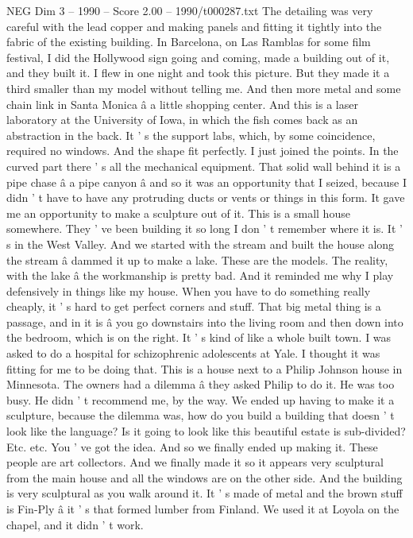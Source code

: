 \begin{textsample}{NEG Dim 3 – 1990 – Score 2.00 – 1990/t000287.txt}
The detailing was very careful with the lead copper and making panels and fitting it tightly into the fabric of the existing building.
In Barcelona, on Las Ramblas for some film festival, I did the Hollywood sign going and coming, made a building out of it, and they built it.
I flew in one night and took this picture.
But they made it a third smaller than my model without telling me.
And then more metal and some chain link in Santa Monica â a little shopping center.
And this is a laser laboratory at the University of Iowa, in which the fish comes back as an abstraction in the back.
It ' s the support labs, which, by some coincidence, required no windows.
And the shape fit perfectly.
I just joined the points.
In the curved part there ' s all the mechanical equipment.
That solid wall behind it is a pipe chase â a pipe canyon â and so it was an opportunity that I seized, because I didn ' t have to have any protruding ducts or vents or things in this form.
It gave me an opportunity to make a sculpture out of it.
This is a small house somewhere.
They ' ve been building it so long I don ' t remember where it is.
It ' s in the West Valley.
And we started with the stream and built the house along the stream â dammed it up to make a lake.
These are the models.
The reality, with the lake â the workmanship is pretty bad.
And it reminded me why I play defensively in things like my house.
When you have to do something really cheaply, it ' s hard to get perfect corners and stuff.
That big metal thing is a passage, and in it is â you go downstairs into the living room and then down into the bedroom, which is on the right.
It ' s kind of like a whole built town.
I was asked to do a hospital for schizophrenic adolescents at Yale.
I thought it was fitting for me to be doing that.
This is a house next to a Philip Johnson house in Minnesota.
The owners had a dilemma â they asked Philip to do it.
He was too busy.
He didn ' t recommend me, by the way.
We ended up having to make it a sculpture, because the dilemma was, how do you build a building that doesn ' t look like the language?
Is it going to look like this beautiful estate is sub-divided?
Etc. etc.
You ' ve got the idea.
And so we finally ended up making it.
These people are art collectors.
And we finally made it so it appears very sculptural from the main house and all the windows are on the other side.
And the building is very sculptural as you walk around it.
It ' s made of metal and the brown stuff is Fin-Ply â it ' s that formed lumber from Finland.
We used it at Loyola on the chapel, and it didn ' t work.

\end{textsample}
